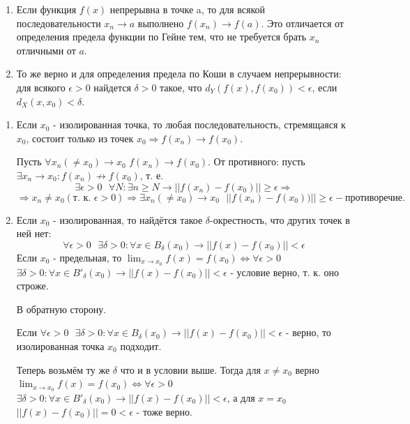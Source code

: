     \begin{mention}
    	\begin{enumerate}
	    	\item Если функция $f(x)$ непрерывна в точке a, то для всякой последовательности $x_n \rightarrow a$ выполнено $f(x_n) \rightarrow f(a)$. Это отличается от определения предела функции по Гейне тем, что не требуется брать $x_n$ отличными от $a$. 
	    	
	    	\item То же верно и для определения предела по Коши в случаем непрерывности: для всякого $\epsilon > 0$ найдется $\delta > 0$ такое, что $d_Y(f(x), f(x_0)) < \epsilon$, если $d_X(x, x_0) < \delta$.
    	\end{enumerate}
    \end{mention}
    
    \begin{explanation}
    	\begin{enumerate}
    		\item Если $x_0$ - изолированная точка, то любая последовательность, стремящаяся к $x_0$, состоит только из точек $x_0 \Rightarrow f(x_n) \rightarrow f(x_0)$.
    		
    		Пусть $\forall x_n (\neq x_0) \to x_0$ $f(x_n) \to f(x_0)$. От противного: пусть $\exists x_n \to x_0 : f(x_n) \not\rightarrow f(x_0)$, т. е.
    		\[ \exists \epsilon > 0 \text{ } \forall N: \exists n \geqslant N \rightarrow ||f(x_n) - f(x_0)|| \geqslant \epsilon \Rightarrow \]
    		\[ \Rightarrow x_n \neq x_0 (\text{т. к. } \epsilon > 0) \Rightarrow \exists x_n (\neq x_0) \to x_0 \text{ } ||f(x_n) - f(x_0))|| \geqslant \epsilon - \text{противоречие.} \]
    		\item Если $x_0$ - изолированная, то найдётся такое $\delta$-окрестность, что других точек в ней нет:
    		\[ \forall \epsilon > 0 \text{ } \exists \delta > 0: \forall x \in B_{\delta}(x_0) \rightarrow ||f(x) - f(x_0)|| < \epsilon \]
    		Если $x_0$ - предельная, то $\lim_{x \to x_0} f(x) = f(x_0) \Leftrightarrow \forall \epsilon > 0$ $\exists \delta > 0: \forall x \in B'_{\delta}(x_0) \rightarrow ||f(x) - f(x_0)|| < \epsilon$ - условие верно, т. к. оно строже.
    		
    		В обратную сторону.
    		
    		Если $\forall \epsilon > 0 \text{ } \exists \delta > 0: \forall x \in B_{\delta}(x_0) \rightarrow ||f(x) - f(x_0)|| < \epsilon$ - верно, то изолированная точка $x_0$ подходит.
    		
    		Теперь возьмём ту же $\delta$ что и в условии выше. Тогда для $x \neq x_0$ верно $\lim_{x \to x_0} f(x) = f(x_0) \Leftrightarrow \forall \epsilon > 0$ $\exists \delta > 0: \forall x \in B'_{\delta}(x_0) \rightarrow ||f(x) - f(x_0)|| < \epsilon$, а для $x = x_0$ $||f(x) - f(x_0)|| = 0 < \epsilon$ - тоже верно.
    	\end{enumerate}
    \end{explanation}
    
